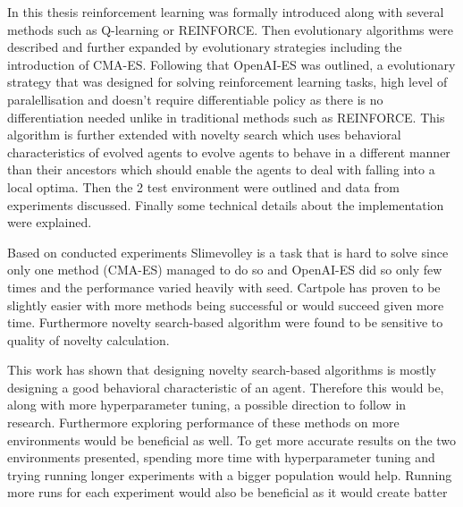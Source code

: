 

In this thesis reinforcement learning was formally introduced along with several methods such as Q-learning or REINFORCE. Then evolutionary algorithms were described and further expanded by evolutionary strategies including the introduction of CMA-ES. Following that OpenAI-ES was outlined, a evolutionary strategy that was designed for solving reinforcement learning tasks, high level of paralellisation and doesn't require differentiable policy as there is no differentiation needed unlike in traditional methods such as REINFORCE. This algorithm is further extended with novelty search which uses behavioral characteristics of evolved agents to evolve agents to behave in a different manner than their ancestors which should enable the agents to deal with falling into a local optima. Then the 2 test environment were outlined and data from experiments discussed. Finally some technical details about the implementation were explained.

Based on conducted experiments Slimevolley is a task that is hard to solve since only one method (CMA-ES) managed to do so and OpenAI-ES did so only few times and the performance varied heavily with seed. Cartpole has proven to be slightly easier with more methods being successful or would succeed given more time. Furthermore novelty search-based algorithm were found to be sensitive to quality of novelty calculation.

This work has shown that designing novelty search-based algorithms is mostly designing a good behavioral characteristic of an agent. Therefore this would be, along with more hyperparameter tuning, a possible direction to follow in research. Furthermore exploring performance of these methods on more environments would be beneficial as well. To get more accurate results on the two environments presented, spending more time with hyperparameter tuning and trying running longer experiments with a bigger population would help. Running more runs for each experiment would also be beneficial as it would create batter



